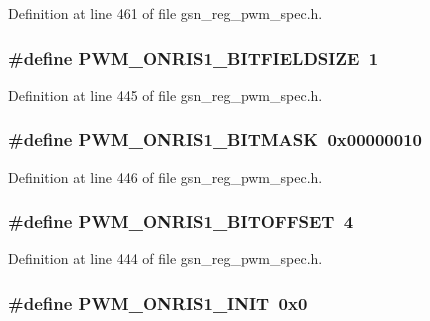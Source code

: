Definition at line 461 of file gsn\_\-reg\_\-pwm\_\-spec.h.

\hypertarget{a00565_a5ed91b07d94e8ef561da94f2914a1d7b}{
\subsubsection[{PWM\_\-ONRIS1\_\-BITFIELDSIZE}]{\setlength{\rightskip}{0pt plus 5cm}\#define PWM\_\-ONRIS1\_\-BITFIELDSIZE~1}}
\label{a00565_a5ed91b07d94e8ef561da94f2914a1d7b}


Definition at line 445 of file gsn\_\-reg\_\-pwm\_\-spec.h.

\hypertarget{a00565_a4fff32a1d2f87b94371ebc9d2d41dc32}{
\subsubsection[{PWM\_\-ONRIS1\_\-BITMASK}]{\setlength{\rightskip}{0pt plus 5cm}\#define PWM\_\-ONRIS1\_\-BITMASK~0x00000010}}
\label{a00565_a4fff32a1d2f87b94371ebc9d2d41dc32}


Definition at line 446 of file gsn\_\-reg\_\-pwm\_\-spec.h.

\hypertarget{a00565_abee1b1081aee0ae78f8116b1b1076d7e}{
\subsubsection[{PWM\_\-ONRIS1\_\-BITOFFSET}]{\setlength{\rightskip}{0pt plus 5cm}\#define PWM\_\-ONRIS1\_\-BITOFFSET~4}}
\label{a00565_abee1b1081aee0ae78f8116b1b1076d7e}


Definition at line 444 of file gsn\_\-reg\_\-pwm\_\-spec.h.

\hypertarget{a00565_a1993e53c914dc39f3f8ad4e54012819c}{
\subsubsection[{PWM\_\-ONRIS1\_\-INIT}]{\setlength{\rightskip}{0pt plus 5cm}\#define PWM\_\-ONRIS1\_\-INIT~0x0}}
\label{a00565_a1993e53c914dc39f3f8ad4e54012819c}


